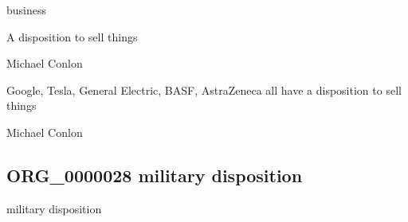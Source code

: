 \documentclass[letterpaper,10pt,english]{sphinxmanual}
\begin{document}
\begin{sphinxShadowBox}

\sphinxAtStartPar
business
\end{sphinxShadowBox}

\begin{sphinxShadowBox}

\sphinxAtStartPar
{\hyperref[\detokenize{doc-BFO_0000016::doc}]{}}
\end{sphinxShadowBox}

\begin{sphinxShadowBox}

\sphinxAtStartPar
A disposition to sell things
\end{sphinxShadowBox}

\begin{sphinxShadowBox}

\sphinxAtStartPar
Michael Conlon 
\end{sphinxShadowBox}

\begin{sphinxShadowBox}

\sphinxAtStartPar
Google, Tesla, General Electric, BASF, AstraZeneca all have a disposition to sell things
\end{sphinxShadowBox}

\begin{sphinxShadowBox}

\sphinxAtStartPar
Michael Conlon 
\end{sphinxShadowBox}
\begin{quote}

\ignorespaces \end{quote}


\subsection{ORG\_0000028 \sphinxhyphen{} military disposition}
\label{\detokenize{doc-ORG_0000028:org-0000028-military-disposition}}\label{\detokenize{doc-ORG_0000028:index-0}}\label{\detokenize{doc-ORG_0000028::doc}}
\begin{sphinxShadowBox}

\sphinxAtStartPar
military disposition
\end{sphinxShadowBox}
\end{document}
